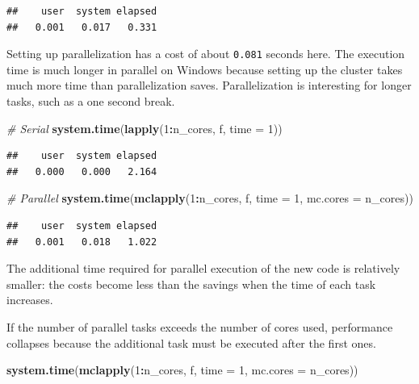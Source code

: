 \documentclass[
  12pt,
  american,
  a4paper,
  extrafontsizes,onecolumn,openright
  ]{memoir}
\newenvironment{Shaded}{\begin{snugshade}}{\end{snugshade}}
\newcommand{\AttributeTok}[1]{\textcolor[rgb]{0.13,0.29,0.53}{#1}}
\newcommand{\CommentTok}[1]{\textcolor[rgb]{0.56,0.35,0.01}{\textit{#1}}}
\newcommand{\DecValTok}[1]{\textcolor[rgb]{0.00,0.00,0.81}{#1}}
\newcommand{\FunctionTok}[1]{\textcolor[rgb]{0.13,0.29,0.53}{\textbf{#1}}}
\newcommand{\NormalTok}[1]{#1}
\newcommand{\SpecialCharTok}[1]{\textcolor[rgb]{0.81,0.36,0.00}{\textbf{#1}}}
\newlength{\rf}
\begin{document}
\begin{verbatim}
##    user  system elapsed 
##   0.001   0.017   0.331
\end{verbatim}

\normalsize

Setting up parallelization has a cost of about \texttt{0.081} seconds here.
The execution time is much longer in parallel on Windows because setting up the cluster takes much more time than parallelization saves.
Parallelization is interesting for longer tasks, such as a one second break.

\scriptsize

\begin{Shaded}
\begin{Highlighting}[]
\CommentTok{\# Serial}
\FunctionTok{system.time}\NormalTok{(}\FunctionTok{lapply}\NormalTok{(}\DecValTok{1}\SpecialCharTok{:}\NormalTok{n\_cores, f, }\AttributeTok{time =} \DecValTok{1}\NormalTok{))}
\end{Highlighting}
\end{Shaded}

\begin{verbatim}
##    user  system elapsed 
##   0.000   0.000   2.164
\end{verbatim}

\begin{Shaded}
\begin{Highlighting}[]
\CommentTok{\# Parallel}
\FunctionTok{system.time}\NormalTok{(}\FunctionTok{mclapply}\NormalTok{(}\DecValTok{1}\SpecialCharTok{:}\NormalTok{n\_cores, f, }\AttributeTok{time =} \DecValTok{1}\NormalTok{, }\AttributeTok{mc.cores =}\NormalTok{ n\_cores))}
\end{Highlighting}
\end{Shaded}

\begin{verbatim}
##    user  system elapsed 
##   0.001   0.018   1.022
\end{verbatim}

\normalsize

The additional time required for parallel execution of the new code is relatively smaller: the costs become less than the savings when the time of each task increases.

If the number of parallel tasks exceeds the number of cores used, performance collapses because the additional task must be executed after the first ones.

\scriptsize

\begin{Shaded}
\begin{Highlighting}[]
\FunctionTok{system.time}\NormalTok{(}\FunctionTok{mclapply}\NormalTok{(}\DecValTok{1}\SpecialCharTok{:}\NormalTok{n\_cores, f, }\AttributeTok{time =} \DecValTok{1}\NormalTok{, }\AttributeTok{mc.cores =}\NormalTok{ n\_cores))}
\end{Highlighting}
\end{Shaded}
\end{document}
